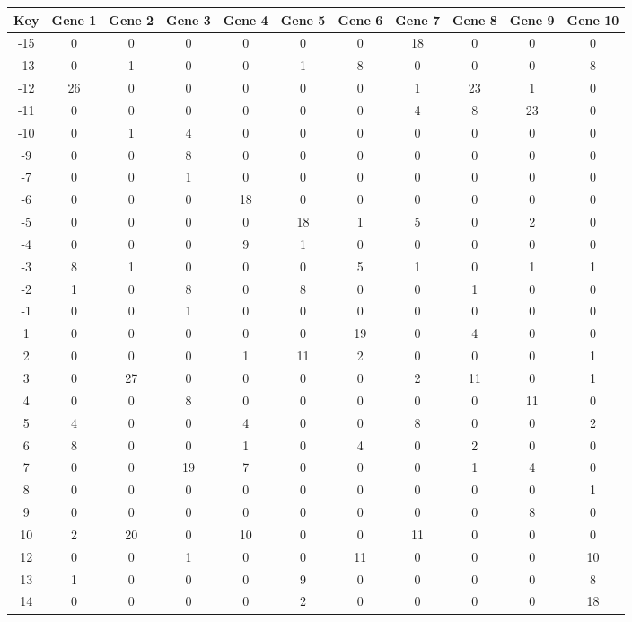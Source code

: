 \begin{tabular}{|c|c|c|c|c|c|c|c|c|c|c|}
\hline
Key & Gene 1 & Gene 2 & Gene 3 & Gene 4 & Gene 5 & Gene 6 & Gene 7 & Gene 8 & Gene 9 & Gene 10 \\
\hline
-15 & 0 & 0 & 0 & 0 & 0 & 0 & 18 & 0 & 0 & 0 \\
-13 & 0 & 1 & 0 & 0 & 1 & 8 & 0 & 0 & 0 & 8 \\
-12 & 26 & 0 & 0 & 0 & 0 & 0 & 1 & 23 & 1 & 0 \\
-11 & 0 & 0 & 0 & 0 & 0 & 0 & 4 & 8 & 23 & 0 \\
-10 & 0 & 1 & 4 & 0 & 0 & 0 & 0 & 0 & 0 & 0 \\
-9 & 0 & 0 & 8 & 0 & 0 & 0 & 0 & 0 & 0 & 0 \\
-7 & 0 & 0 & 1 & 0 & 0 & 0 & 0 & 0 & 0 & 0 \\
-6 & 0 & 0 & 0 & 18 & 0 & 0 & 0 & 0 & 0 & 0 \\
-5 & 0 & 0 & 0 & 0 & 18 & 1 & 5 & 0 & 2 & 0 \\
-4 & 0 & 0 & 0 & 9 & 1 & 0 & 0 & 0 & 0 & 0 \\
-3 & 8 & 1 & 0 & 0 & 0 & 5 & 1 & 0 & 1 & 1 \\
-2 & 1 & 0 & 8 & 0 & 8 & 0 & 0 & 1 & 0 & 0 \\
-1 & 0 & 0 & 1 & 0 & 0 & 0 & 0 & 0 & 0 & 0 \\
1 & 0 & 0 & 0 & 0 & 0 & 19 & 0 & 4 & 0 & 0 \\
2 & 0 & 0 & 0 & 1 & 11 & 2 & 0 & 0 & 0 & 1 \\
3 & 0 & 27 & 0 & 0 & 0 & 0 & 2 & 11 & 0 & 1 \\
4 & 0 & 0 & 8 & 0 & 0 & 0 & 0 & 0 & 11 & 0 \\
5 & 4 & 0 & 0 & 4 & 0 & 0 & 8 & 0 & 0 & 2 \\
6 & 8 & 0 & 0 & 1 & 0 & 4 & 0 & 2 & 0 & 0 \\
7 & 0 & 0 & 19 & 7 & 0 & 0 & 0 & 1 & 4 & 0 \\
8 & 0 & 0 & 0 & 0 & 0 & 0 & 0 & 0 & 0 & 1 \\
9 & 0 & 0 & 0 & 0 & 0 & 0 & 0 & 0 & 8 & 0 \\
10 & 2 & 20 & 0 & 10 & 0 & 0 & 11 & 0 & 0 & 0 \\
12 & 0 & 0 & 1 & 0 & 0 & 11 & 0 & 0 & 0 & 10 \\
13 & 1 & 0 & 0 & 0 & 9 & 0 & 0 & 0 & 0 & 8 \\
14 & 0 & 0 & 0 & 0 & 2 & 0 & 0 & 0 & 0 & 18 \\
\hline
\end{tabular}